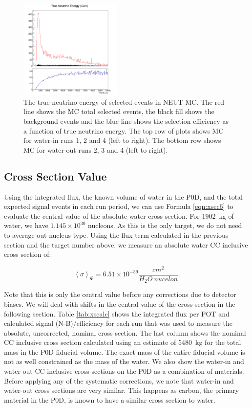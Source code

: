 {\begin{landscape}
\begin{figure}[h]
\includegraphics[width=2in]{Figures/TN100Plots/c_nuEair_4.png}
\caption{The true neutrino energy of selected events in NEUT MC. The red line shows the MC total selected events, the black fill shows the background events and the blue line shows the selection efficiency as a function of true neutrino energy. The top row of plots shows MC for water-in runs 1, 2 and 4 (left to right). The bottom row shows MC for water-out runs 2, 3 and 4 (left to right).}
\label{fig:nuEeff}
\end{figure}
\end{landscape}
}


\subsection{Cross Section Value}

Using the integrated flux, the known volume of water in the P0D, and the total expected signal events in each run period, we can use Formula \ref{eqn:xsec6} to evaluate the central value of the absolute water cross section. For 1902~kg of water, we have $1.145\times10^{30}$ nucleons. As this is the only target, we do not need to average out nucleus type. Using the flux term calculated in the previous section and the target number above, we measure an absolute water CC inclusive cross section of:

\begin{equation}
\left<\sigma\right>_\Phi = 6.51 \times 10^{-39} \frac{cm^2}{H_2O\:nucelon}.
\end{equation}

Note that this is only the central value before any corrections due to detector biases. We will deal with shifts in the central value of the cross section in the following section. Table \ref{tab:xscalc} shows the integrated flux per POT and calculated signal (N-B)/efficiency for each run that was used to measure the absolute, uncorrected, nominal cross section. The last column shows the nominal CC inclusive cross section calculated using an estimate of 5480~kg for the total mass in the P0D fiducial volume. The exact mass of the entire fiducial volume is not as well constrained as the mass of the water. We also show the water-in and water-out CC inclusive cross sections on the P0D as a combination of materials. Before applying any of the systematic corrections, we note that water-in and water-out cross sections are very similar. This happens as carbon, the primary material in the P0D, is known to have a similar cross section to water.

